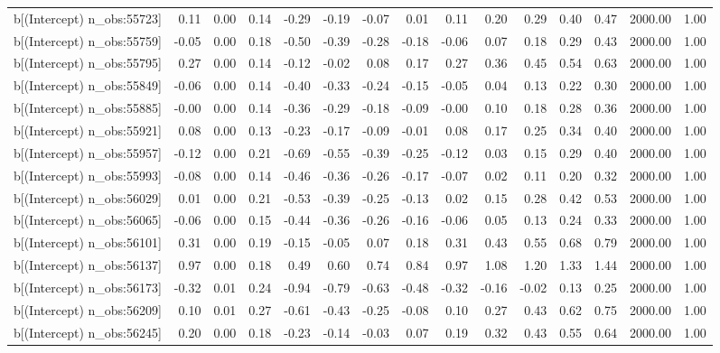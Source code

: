 \begin{table}[ht]
\begin{tabular}{rrrrrrrrrrrrrrr}
  b[(Intercept) n\_obs:55723] & 0.11 & 0.00 & 0.14 & -0.29 & -0.19 & -0.07 & 0.01 & 0.11 & 0.20 & 0.29 & 0.40 & 0.47 & 2000.00 & 1.00 \\ 
  b[(Intercept) n\_obs:55759] & -0.05 & 0.00 & 0.18 & -0.50 & -0.39 & -0.28 & -0.18 & -0.06 & 0.07 & 0.18 & 0.29 & 0.43 & 2000.00 & 1.00 \\ 
  b[(Intercept) n\_obs:55795] & 0.27 & 0.00 & 0.14 & -0.12 & -0.02 & 0.08 & 0.17 & 0.27 & 0.36 & 0.45 & 0.54 & 0.63 & 2000.00 & 1.00 \\ 
  b[(Intercept) n\_obs:55849] & -0.06 & 0.00 & 0.14 & -0.40 & -0.33 & -0.24 & -0.15 & -0.05 & 0.04 & 0.13 & 0.22 & 0.30 & 2000.00 & 1.00 \\ 
  b[(Intercept) n\_obs:55885] & -0.00 & 0.00 & 0.14 & -0.36 & -0.29 & -0.18 & -0.09 & -0.00 & 0.10 & 0.18 & 0.28 & 0.36 & 2000.00 & 1.00 \\ 
  b[(Intercept) n\_obs:55921] & 0.08 & 0.00 & 0.13 & -0.23 & -0.17 & -0.09 & -0.01 & 0.08 & 0.17 & 0.25 & 0.34 & 0.40 & 2000.00 & 1.00 \\ 
  b[(Intercept) n\_obs:55957] & -0.12 & 0.00 & 0.21 & -0.69 & -0.55 & -0.39 & -0.25 & -0.12 & 0.03 & 0.15 & 0.29 & 0.40 & 2000.00 & 1.00 \\ 
  b[(Intercept) n\_obs:55993] & -0.08 & 0.00 & 0.14 & -0.46 & -0.36 & -0.26 & -0.17 & -0.07 & 0.02 & 0.11 & 0.20 & 0.32 & 2000.00 & 1.00 \\ 
  b[(Intercept) n\_obs:56029] & 0.01 & 0.00 & 0.21 & -0.53 & -0.39 & -0.25 & -0.13 & 0.02 & 0.15 & 0.28 & 0.42 & 0.53 & 2000.00 & 1.00 \\ 
  b[(Intercept) n\_obs:56065] & -0.06 & 0.00 & 0.15 & -0.44 & -0.36 & -0.26 & -0.16 & -0.06 & 0.05 & 0.13 & 0.24 & 0.33 & 2000.00 & 1.00 \\ 
  b[(Intercept) n\_obs:56101] & 0.31 & 0.00 & 0.19 & -0.15 & -0.05 & 0.07 & 0.18 & 0.31 & 0.43 & 0.55 & 0.68 & 0.79 & 2000.00 & 1.00 \\ 
  b[(Intercept) n\_obs:56137] & 0.97 & 0.00 & 0.18 & 0.49 & 0.60 & 0.74 & 0.84 & 0.97 & 1.08 & 1.20 & 1.33 & 1.44 & 2000.00 & 1.00 \\ 
  b[(Intercept) n\_obs:56173] & -0.32 & 0.01 & 0.24 & -0.94 & -0.79 & -0.63 & -0.48 & -0.32 & -0.16 & -0.02 & 0.13 & 0.25 & 2000.00 & 1.00 \\ 
  b[(Intercept) n\_obs:56209] & 0.10 & 0.01 & 0.27 & -0.61 & -0.43 & -0.25 & -0.08 & 0.10 & 0.27 & 0.43 & 0.62 & 0.75 & 2000.00 & 1.00 \\ 
  b[(Intercept) n\_obs:56245] & 0.20 & 0.00 & 0.18 & -0.23 & -0.14 & -0.03 & 0.07 & 0.19 & 0.32 & 0.43 & 0.55 & 0.64 & 2000.00 & 1.00 \\ 

\end{tabular}
\end{table}

